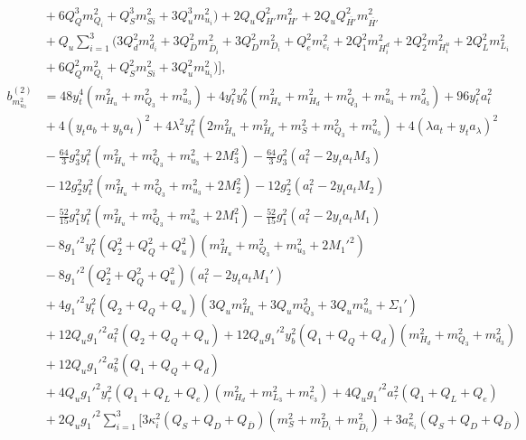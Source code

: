 \documentclass[preprint,amsmath,amssymb,aps,superscriptaddress,prd,showpacs,floatfix,nofootinbib]{revtex4-1}
\begin{document}
\begin{subequations}
\begin{align}
&{}+6Q_Q^3m_{Q_i}^2+Q_S^3m_{Si}^2+3Q_u^3m_{u_i}^2\big )+2Q_uQ_{H'}^2m_{H'}^2+2Q_uQ_{\overline{H'}}^2m_{\overline{H'}}^2\nonumber\\
&{}+Q_u\sum_{i=1}^3\big ( 3Q_d^2m_{d_i}^2+3Q_{\overline{D}}^2m_{\overline{D}_i}^2+3Q_D^2m_{D_i}^2+Q_e^2m_{e_i}^2+2Q_1^2m_{H_i^d}^2+2Q_2^2m_{H_i^u}^2+2Q_L^2m_{L_i}^2\nonumber\\
&{}+6Q_Q^2m_{Q_i}^2+Q_S^2m_{Si}^2+3Q_u^2m_{u_i}^2\big )\bigg ],\label{eq:USSMmu222BetaTwoLoop}\\
b_{m_{u_3}^2}^{(2)}&=48y_t^4\left ( m_{H_u}^2+m_{Q_3}^2+m_{u_3}^2 \right )+4y_t^2y_b^2\left ( m_{H_u}^2+m_{H_d}^2+m_{Q_3}^2+m_{u_3}^2+m_{d_3}^2 \right )+96y_t^2a_t^2\nonumber\\
&{}+4\left ( y_ta_b+y_ba_t\right )^2+4\lambda^2y_t^2\left ( 2m_{H_u}^2+m_{H_d}^2+m_S^2+m_{Q_3}^2+m_{u_3}^2 \right )+4\left ( \lambda a_t+y_ta_\lambda\right )^2\nonumber\\
&{}-\frac{64}{3}g_3^2y_t^2\left ( m_{H_u}^2+m_{Q_3}^2+m_{u_3}^2+2M_3^2\right )-\frac{64}{3}g_3^2\left ( a_t^2-2y_ta_tM_3 \right )\nonumber\\
&{}-12g_2^2y_t^2\left ( m_{H_u}^2+m_{Q_3}^2+m_{u_3}^2+2M_2^2\right )-12g_2^2\left ( a_t^2-2y_ta_tM_2\right )\nonumber\\
&{}-\frac{52}{15}g_1^2y_t^2\left ( m_{H_u}^2+m_{Q_3}^2+m_{u_3}^2+2M_1^2\right )-\frac{52}{15}g_1^2\left ( a_t^2-2y_ta_tM_1\right )\nonumber\\
&{}-8g_1'^2y_t^2\left ( Q_2^2+Q_Q^2+Q_u^2\right )\left ( m_{H_u}^2+m_{Q_3}^2+m_{u_3}^2+2M_1'^2\right )\nonumber\\
&{}-8g_1'^2\left ( Q_2^2+Q_Q^2+Q_u^2\right )\left ( a_t^2-2y_ta_tM_1'\right )\nonumber\\
&{}+4g_1'^2y_t^2\left ( Q_2+Q_Q+Q_u\right )\left ( 3Q_um_{H_u}^2+3Q_um_{Q_3}^2+3Q_um_{u_3}^2+\Sigma_1'\right )\nonumber\\
&{}+12Q_ug_1'^2a_t^2\left ( Q_2+Q_Q+Q_u\right )+12Q_ug_1'^2y_b^2\left ( Q_1+Q_Q+Q_d \right )\left ( m_{H_d}^2+m_{Q_3}^2+m_{d_3}^2\right )\nonumber\\
&{}+12Q_ug_1'^2a_b^2\left ( Q_1+Q_Q+Q_d \right )\nonumber\\
&{}+4Q_ug_1'^2y_\tau^2\left ( Q_1+Q_L+Q_e\right )\left ( m_{H_d}^2+m_{L_3}^2+m_{e_3}^2\right )+4Q_ug_1'^2a_\tau^2\left ( Q_1+Q_L+Q_e\right )\nonumber\\
&{}+2Q_ug_1'^2\sum_{i=1}^3\bigg [ 3\kappa_i^2\left ( Q_S+Q_D+Q_{\overline{D}}\right )\left ( m_S^2+m_{D_i}^2+m_{\overline{D}_i}^2\right )+3a_{\kappa_i}^2\left ( Q_S+Q_D+Q_{\overline{D}}\right )\nonumber\\

\end{align}
\end{subequations}
\end{document}
